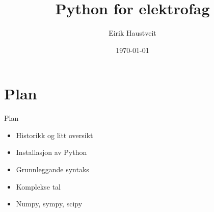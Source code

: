 \documentclass[10pt,a4paper]{beamer}
\title{Python for elektrofag}
\date{\today}
\author{Eirik Haustveit}
\institute{Institutt for datateknologi, elektroteknologi og realfag}
\begin{document}
	
	\titlepage

	\section{Plan}

	\begin{frame}{Plan}
		
          \begin{itemize}
			\item Historikk og litt oversikt
            \item Installasjon av Python
            \item Grunnleggande syntaks
            \item Komplekse tal
            \item Numpy, sympy, scipy
		\end{itemize}
		
	\end{frame}


	
	
	
	
		

    

    

    

    

    
    
    
    
    

	
	
	
	
\end{document}
